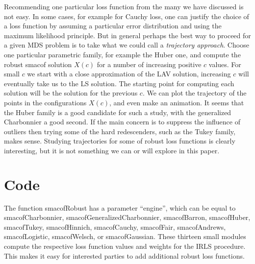 \documentclass[
  12pt,
  letterpaper,
  DIV=11,
  numbers=noendperiod]{scrartcl}
\newcommand{\sectionbreak}{\pagebreak}
\theoremstyle{plain}
\theoremstyle{plain}
\theoremstyle{plain}
\theoremstyle{definition}
\theoremstyle{definition}
\theoremstyle{remark}
\begin{document}
Recommending one particular loss function from the many we have
discussed is not easy. In some cases, for example for Cauchy loss, one
can justify the choice of a loss function by assuming a particular error
distribution and using the maximum likelihood principle. But in general
perhaps the best way to proceed for a given MDS problem is to take what
we could call a \emph{trajectory approach}. Choose one particular
parametric family, for example the Huber one, and compute the robust
smacof solution \(X(c)\) for a number of increasing positive \(c\)
values. For small \(c\) we start with a close approximation of the LAV
solution, increasing \(c\) will eventually take us to the LS solution.
The starting point for computing each solution will be the solution for
the previous \(c\). We can plot the trajectory of the points in the
configurations \(X(c)\), and even make an animation. It seems that the
Huber family is a good candidate for such a study, with the generalized
Charbonnier a good second. If the main concern is to suppress the
influence of outliers then trying some of the hard redescenders, such as
the Tukey family, makes sense. Studying trajectories for some of robust
loss functions is clearly interesting, but it is not something we can or
will explore in this paper.

\sectionbreak

\section{Code}\label{code}

The function smacofRobust has a parameter ``engine'', which can be equal
to smacofCharbonnier, smacofGeneralizedCharbonnier, smacofBarron,
smacofHuber, smacofTukey, smacofHinnich, smacofCauchy, smacofFair,
smacofAndrews, smacofLogistic, smacofWelsch, or smacofGaussian. These
thirteen small modules compute the respective loss function values and
weights for the IRLS procedure. This makes it easy for interested
parties to add additional robust loss functions.
\end{document}
